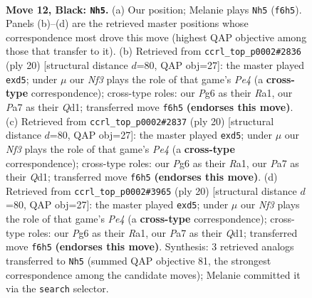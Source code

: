 \documentclass[11pt]{article}
\begin{document}
\clearpage

\begin{figure}[p]\centering
\begin{subfigure}{0.46\textwidth}\centering
\resizebox{\linewidth}{!}{%
\newchessgame
\chessboard[
  setfen={rnb1k2r/ppq1p1bp/3p1np1/4p1P1/4P3/2N1BQ2/PPP2P1P/2KR1B1R b kq - 0 12},
  showmover=false,
  pgfstyle=straightmove, color=movearrow, markmove={f6-h5}
]}
\caption{}
\end{subfigure}\hfill
\begin{subfigure}{0.46\textwidth}\centering
\resizebox{\linewidth}{!}{%
\newchessgame
\chessboard[
  setfen={r1bq1rk1/pp2npb1/6pp/2ppp3/2B1P3/3P1N1P/PPP2PP1/RN1QR1K1 w - - 0 11},
  showmover=false,
  pgfstyle=straightmove, color=movearrow, markmove={e4-d5}
]}
\caption{}
\end{subfigure}
\\[4pt]
\begin{subfigure}{0.46\textwidth}\centering
\resizebox{\linewidth}{!}{%
\newchessgame
\chessboard[
  setfen={r1bq1rk1/pp2npb1/6pp/2ppp3/2B1P3/3P1N1P/PPP2PP1/RN1QR1K1 w - - 0 11},
  showmover=false,
  pgfstyle=straightmove, color=movearrow, markmove={e4-d5}
]}
\caption{}
\end{subfigure}\hfill
\begin{subfigure}{0.46\textwidth}\centering
\resizebox{\linewidth}{!}{%
\newchessgame
\chessboard[
  setfen={r1bq1rk1/pp2npb1/6pp/2ppp3/2B1P3/3P1N1P/PPP2PP1/RN1QR1K1 w - - 0 11},
  showmover=false,
  pgfstyle=straightmove, color=movearrow, markmove={e4-d5}
]}
\caption{}
\end{subfigure}
\caption{\textbf{Move 12, Black: \texttt{Nh5}.} (a) Our position; Melanie plays \texttt{Nh5} (\texttt{f6h5}). Panels (b)--(d) are the retrieved master positions whose correspondence most drove this move (highest QAP objective among those that transfer to it). (b) Retrieved from \texttt{ccrl\_top\_p0002\#2836} (ply 20) [structural distance $d$=80, QAP obj=27]: the master played \texttt{exd5}; under $\mu$ our \emph{Nf3} plays the role of that game's \emph{Pe4} (a \textbf{cross-type} correspondence); cross-type roles: our \emph{P}g6 as their \emph{R}a1, our \emph{P}a7 as their \emph{Q}d1; transferred move \texttt{f6h5} \textbf{(endorses this move)}. (c) Retrieved from \texttt{ccrl\_top\_p0002\#2837} (ply 20) [structural distance $d$=80, QAP obj=27]: the master played \texttt{exd5}; under $\mu$ our \emph{Nf3} plays the role of that game's \emph{Pe4} (a \textbf{cross-type} correspondence); cross-type roles: our \emph{P}g6 as their \emph{R}a1, our \emph{P}a7 as their \emph{Q}d1; transferred move \texttt{f6h5} \textbf{(endorses this move)}. (d) Retrieved from \texttt{ccrl\_top\_p0002\#3965} (ply 20) [structural distance $d$=80, QAP obj=27]: the master played \texttt{exd5}; under $\mu$ our \emph{Nf3} plays the role of that game's \emph{Pe4} (a \textbf{cross-type} correspondence); cross-type roles: our \emph{P}g6 as their \emph{R}a1, our \emph{P}a7 as their \emph{Q}d1; transferred move \texttt{f6h5} \textbf{(endorses this move)}. Synthesis: 3 retrieved analogs transferred to \texttt{Nh5} (summed QAP objective 81, the strongest correspondence among the candidate moves); Melanie committed it via the \texttt{search} selector.}

\end{figure}
\end{document}
